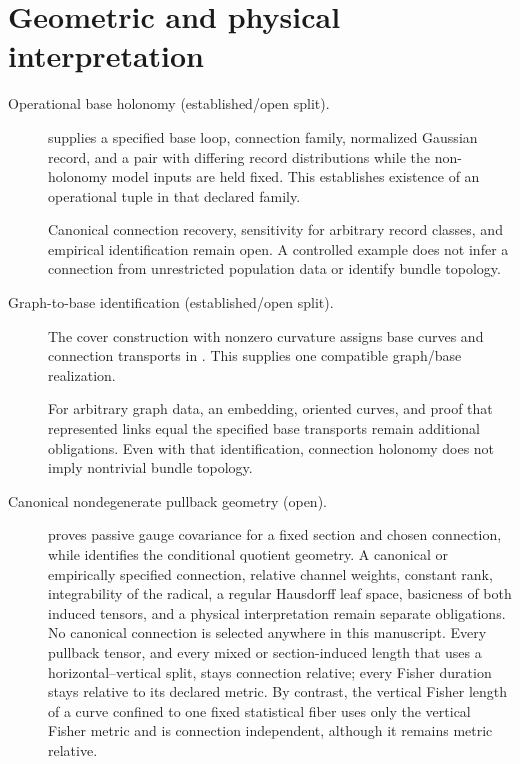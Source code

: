\section{Geometric and physical interpretation}

\begin{description}
\item[Operational base holonomy (established/open split).]
 supplies a specified base loop,
connection family, normalized Gaussian record, and a pair with differing
record distributions while the non-holonomy model inputs are held fixed.
This establishes existence of an operational tuple in that declared
family. 

Canonical connection recovery, sensitivity for arbitrary record classes,
and empirical identification remain open. A controlled example does not
infer a connection from unrestricted population data or identify bundle
topology. 

\item[Graph-to-base identification (established/open split).]
The cover construction with nonzero curvature assigns base curves and
connection transports in . This supplies
one compatible graph/base realization. 

For arbitrary graph data, an embedding, oriented curves, and proof that
represented links equal the specified base transports remain additional
obligations. Even with that identification, connection holonomy does not
imply nontrivial bundle topology. 

\item[Canonical nondegenerate pullback geometry (open).]
 proves passive gauge covariance for a
fixed section and chosen connection, while
 identifies the conditional quotient
geometry.  A canonical or empirically specified connection, relative channel
weights, constant rank, integrability of the radical, a regular Hausdorff leaf
space, basicness of both induced tensors, and a physical interpretation remain
separate obligations.  No canonical connection is selected anywhere in this
manuscript.  Every pullback tensor, and every mixed or section-induced length
that uses a horizontal--vertical split, stays connection relative; every
Fisher duration stays relative to its declared metric.  By contrast, the
vertical Fisher length of a curve confined to one fixed statistical fiber uses
only the vertical Fisher metric and is connection independent, although it
remains metric relative. 


\end{description}

